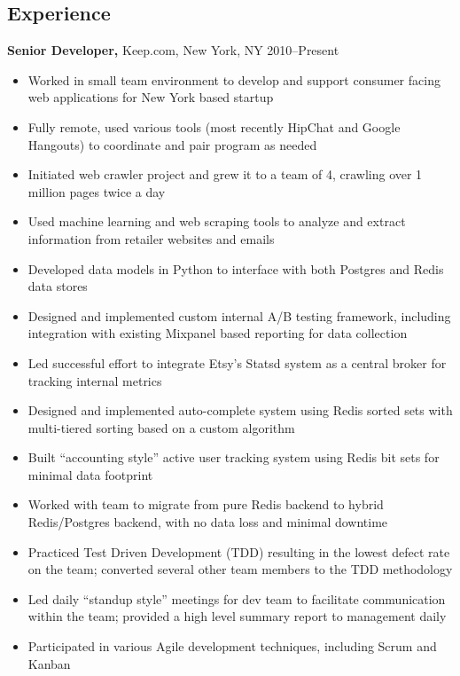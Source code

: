 \documentclass[margin]{res}
\begin{document}
\begin{resume}
\section{Experience}
 {\bf Senior Developer,} Keep.com, New York, NY \hfill 2010--Present
\begin{itemize}
  \item Worked in small team environment to develop and support consumer
    facing web applications for New York based startup
  \item Fully remote, used various tools (most recently HipChat and Google
    Hangouts) to coordinate and pair program as needed
  \item Initiated web crawler project and grew it to a team of 4, crawling
    over 1 million pages twice a day
  \item Used machine learning and web scraping tools to analyze and extract
    information from retailer websites and emails
  \item Developed data models in Python to interface with both Postgres and
    Redis data stores
  \item Designed and implemented custom internal A/B testing framework,
    including integration with existing Mixpanel based reporting for data
    collection
  \item Led successful effort to integrate Etsy's Statsd system as a central
    broker for tracking internal metrics
  \item Designed and implemented auto-complete system using Redis sorted sets
    with multi-tiered sorting based on a custom algorithm
  \item Built ``accounting style'' active user tracking system using Redis bit
    sets for minimal data footprint
  \item Worked with team to migrate from pure Redis backend to hybrid
    Redis/Postgres backend, with no data loss and minimal downtime
  \item Practiced Test Driven Development (TDD) resulting in the lowest defect
    rate on the team; converted several other team members to the TDD
    methodology
  \item Led daily “standup style” meetings for dev team to facilitate
    communication within the team; provided a high level summary report to
    management daily
  \item Participated in various Agile development techniques, including Scrum
    and Kanban
\end{itemize}


\end{resume}
\end{document}
